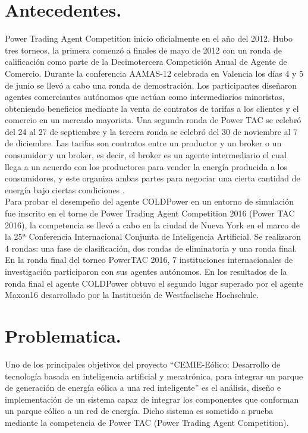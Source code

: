 \section{Antecedentes.}
Power Trading Agent Competition inicio oficialmente en el año del 2012. Hubo tres torneos, la primera comenzó a finales de mayo de 2012 con un ronda de calificación  como parte de la  Decimotercera Competición Anual de Agente de Comercio. Durante la conferencia AAMAS-12 celebrada en Valencia los días 4 y 5 de junio se llevó a cabo una ronda de demostración. Los participantes diseñaron agentes comerciantes autónomos que actúan como intermediarios minoristas, obteniendo beneficios mediante la venta de contratos de tarifas a los clientes y el comercio en un mercado mayorista. Una segunda ronda de Power TAC se celebró del 24 al 27 de septiembre y la tercera ronda se celebró del 30 de noviembre al 7 de diciembre.
Las tarifas son contratos entre un productor y un broker o un consumidor y un broker, es decir, el broker es un agente intermediario el cual llega a un acuerdo con los productores para vender la energía producida a los consumidores, y este organiza ambas partes para negociar una cierta cantidad de energía bajo ciertas condiciones \cite{MPAlonsoAYRGonzalezDesarrolloDeTec}.\\

Para probar el desempeño del agente COLDPower en un entorno de simulación fue inscrito en el torne de Power Trading Agent Competition 2016 (Power TAC 2016), la competencia se llevó a cabo en la ciudad de Nueva York en el marco de la 25ª Conferencia Internacional Conjunta de Inteligencia Artificial. Se realizaron 4 rondas: una fase de clasificación, dos rondas de eliminatoria y una ronda final. En la ronda final del torneo PowerTAC 2016, 7 instituciones internacionales de investigación participaron con sus agentes autónomos. En los resultados de la ronda final el agente COLDPower obtuvo el segundo lugar superado por el agente Maxon16 desarrollado por la Institución de Westfaelische Hochschule.

\section{Problematica.}
Uno de los principales objetivos del proyecto “CEMIE-Eólico: Desarrollo de tecnología basada en inteligencia artificial y mecatrónica, para integrar un parque de generación de energía eólica a una red inteligente” es el análisis, diseño e implementación de un sistema capaz de integrar los componentes que conforman un parque eólico a un red de energía. Dicho sistema es sometido a prueba mediante la competencia de Power TAC (Power Trading Agent Competition).
\\


